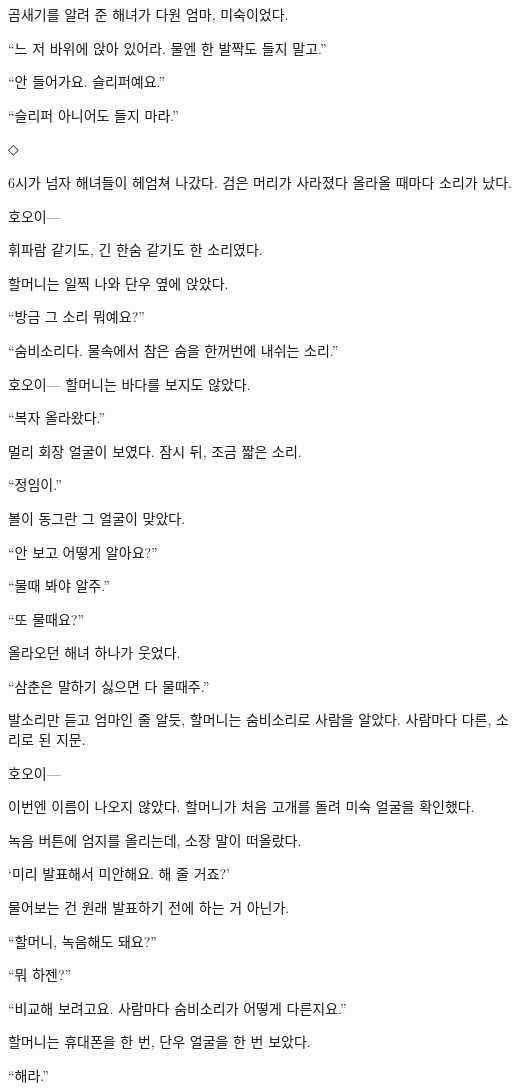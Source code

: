 \documentclass[
  korean,
  letterpaper,
  twoside,
  open=any,
  fontsize=12.5pt,
  headings=small]{scrbook}
\begin{document}
곰새기를 알려 준 해녀가 다원
엄마, 미숙이었다.

``느 저 바위에 앉아 있어라.
물엔 한 발짝도 들지 말고.''

``안 들어가요. 슬리퍼예요.''

``슬리퍼 아니어도 들지 마라.''

\begin{center}◇\end{center}\nopagebreak

6시가 넘자 해녀들이 헤엄쳐
나갔다. 검은 머리가 사라졌다
올라올 때마다 소리가 났다.

호오이---

휘파람 같기도, 긴 한숨 같기도
한 소리였다.

할머니는 일찍 나와 단우 옆에
앉았다.

``방금 그 소리 뭐예요?''

``숨비소리다. 물속에서 참은
숨을 한꺼번에 내쉬는 소리.''

호오이--- 할머니는 바다를
보지도 않았다.

``복자 올라왔다.''

멀리 회장 얼굴이 보였다. 잠시
뒤, 조금 짧은 소리.

``정임이.''

볼이 동그란 그 얼굴이 맞았다.

``안 보고 어떻게 알아요?''

``물때 봐야 알주.''

``또 물때요?''

올라오던 해녀 하나가 웃었다.

``삼춘은 말하기 싫으면 다
물때주.''

발소리만 듣고 엄마인 줄 알듯,
할머니는 숨비소리로 사람을
알았다. 사람마다 다른, 소리로
된 지문.

호오이---

이번엔 이름이 나오지 않았다.
할머니가 처음 고개를 돌려 미숙
얼굴을 확인했다.

녹음 버튼에 엄지를 올리는데,
소장 말이 떠올랐다.

`미리 발표해서 미안해요. 해 줄
거죠?'

물어보는 건 원래 발표하기 전에
하는 거 아닌가.

``할머니, 녹음해도 돼요?''

``뭐 하젠?''

``비교해 보려고요. 사람마다
숨비소리가 어떻게 다른지요.''

할머니는 휴대폰을 한 번, 단우
얼굴을 한 번 보았다.

``해라.''
\end{document}
